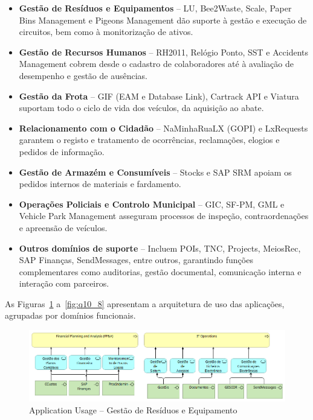 \documentclass[12pt,a4paper,final]{article}
\begin{document}
    \begin{itemize}
        \item \textbf{Gestão de Resíduos e Equipamentos} – LU, Bee2Waste, Scale, Paper Bins Management e Pigeons Management dão suporte à gestão e execução de circuitos, bem como à monitorização de ativos.
        \item \textbf{Gestão de Recursos Humanos} – RH2011, Relógio Ponto, SST e Accidents Management cobrem desde o cadastro de colaboradores até à avaliação de desempenho e gestão de ausências.
        \item \textbf{Gestão da Frota} – GIF (EAM e Database Link), Cartrack API e Viatura suportam todo o ciclo de vida dos veículos, da aquisição ao abate.
        \item \textbf{Relacionamento com o Cidadão} – NaMinhaRuaLX (GOPI) e LxRequests garantem o registo e tratamento de ocorrências, reclamações, elogios e pedidos de informação.
        \item \textbf{Gestão de Armazém e Consumíveis} – Stocks e SAP SRM apoiam os pedidos internos de materiais e fardamento.
        \item \textbf{Operações Policiais e Controlo Municipal} – GIC, SF-PM, GML e Vehicle Park Management asseguram processos de inspeção, contraordenações e apreensão de veículos.
        \item \textbf{Outros domínios de suporte} – Incluem POIs, TNC, Projects, MeiosRec, SAP Finanças, SendMessages, entre outros, garantindo funções complementares como auditorias, gestão documental, comunicação interna e interação com parceiros.
    \end{itemize}

    As Figuras~\ref{fig:q10_1} a~\ref{fig:q10_8} apresentam a arquitetura de uso das aplicações, agrupadas por domínios funcionais.

    \vspace{0.5cm}

    \begin{figure}[H]
        \centering
        \includegraphics[width=\textwidth]{Q10_1}
        \caption{Application Usage – Gestão de Resíduos e Equipamento}
        \label{fig:q10_1}
    \end{figure}
\end{document}
